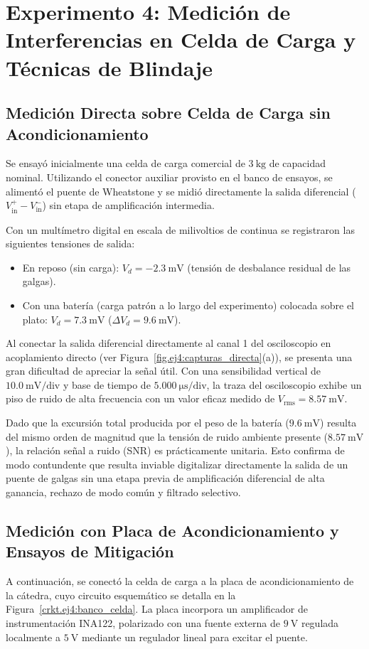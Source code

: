 \clearpage
\section{Experimento 4: Medición de Interferencias en Celda de Carga y Técnicas de Blindaje}

\subsection{Medición Directa sobre Celda de Carga sin Acondicionamiento}
Se ensayó inicialmente una celda de carga comercial de $\qty{3}{\kilogram}$ de capacidad nominal. Utilizando el conector
auxiliar provisto en el banco de ensayos, se alimentó el puente de Wheatstone y se midió directamente la salida
diferencial ($V_{\text{in}}^+ - V_{\text{in}}^-$) sin etapa de amplificación intermedia.

Con un multímetro digital en escala de milivoltios de continua se registraron las siguientes tensiones de salida:
\begin{itemize}
    \item En reposo (sin carga): $V_d = \qty{-2.3}{\milli\volt}$ (tensión de desbalance residual de las galgas).
    \item Con una batería (carga patrón a lo largo del experimento) colocada sobre el plato: $V_d = \qty{+7.3}{\milli\volt}$ ($\Delta V_d
        = \qty{9.6}{\milli\volt}$).
\end{itemize}

Al conectar la salida diferencial directamente al canal 1 del osciloscopio en acoplamiento directo (ver
Figura~\ref{fig.ej4:capturas_directa}(a)), se presenta una gran dificultad de apreciar la señal útil. Con una
sensibilidad vertical de $\qty{10.0}{\milli\volt/\text{div}}$ y base de tiempo de $\qty{5.000}{\micro\second/\text{div}}$,
la traza del osciloscopio exhibe un piso de ruido de alta frecuencia con un valor eficaz medido de
$V_{\text{rms}} = \qty{8.57}{\milli\volt}$.

Dado que la excursión total producida por el peso de la batería ($\qty{9.6}{\milli\volt}$) resulta del mismo
orden de magnitud que la tensión de ruido ambiente presente ($\qty{8.57}{\milli\volt}$), la relación señal a
ruido (SNR) es prácticamente unitaria. Esto confirma de modo contundente que resulta inviable digitalizar
directamente la salida de un puente de galgas sin una etapa previa de amplificación diferencial de alta
ganancia, rechazo de modo común y filtrado selectivo.

\subsection{Medición con Placa de Acondicionamiento y Ensayos de Mitigación}
A continuación, se conectó la celda de carga a la placa de acondicionamiento de la cátedra, cuyo circuito esquemático
se detalla en la Figura~\ref{crkt.ej4:banco_celda}. La placa incorpora un amplificador de instrumentación INA122,
polarizado con una fuente externa de $\qty{+9}{\volt}$ regulada localmente a $\qty{+5}{\volt}$ mediante un
regulador lineal para excitar el puente.

